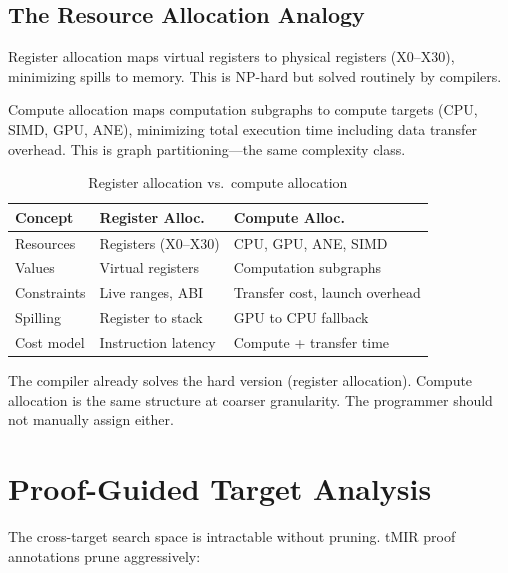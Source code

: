 \documentclass[11pt,twocolumn]{article}
\begin{document}
\subsection{The Resource Allocation Analogy}

Register allocation maps virtual registers to physical registers (X0--X30), minimizing spills to memory. This is NP-hard but solved routinely by compilers.

Compute allocation maps computation subgraphs to compute targets (CPU, SIMD, GPU, ANE), minimizing total execution time including data transfer overhead. This is graph partitioning---the same complexity class.

\begin{table}[h]
\centering
\caption{Register allocation vs.\ compute allocation}
\label{tab:analogy}
\small
\begin{tabular}{@{}lll@{}}
\toprule
\textbf{Concept} & \textbf{Register Alloc.} & \textbf{Compute Alloc.} \\
\midrule
Resources & Registers (X0--X30) & CPU, GPU, ANE, SIMD \\
Values & Virtual registers & Computation subgraphs \\
Constraints & Live ranges, ABI & Transfer cost, launch overhead \\
Spilling & Register to stack & GPU to CPU fallback \\
Cost model & Instruction latency & Compute + transfer time \\
\bottomrule
\end{tabular}
\end{table}

The compiler already solves the hard version (register allocation). Compute allocation is the same structure at coarser granularity. The programmer should not manually assign either.

\section{Proof-Guided Target Analysis}
\label{sec:proofs}

The cross-target search space is intractable without pruning. tMIR proof annotations prune aggressively:
\end{document}
